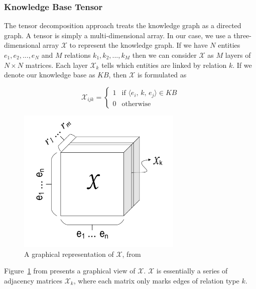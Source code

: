 \documentclass[pageno]{final_paper}
\begin{document}
\subsubsection{Knowledge Base Tensor}
\label{Knowledge Base Tensor}

The tensor decomposition approach treats the knowledge graph as a directed
graph. A tensor is simply a multi-dimensional array. In our case, we use a
three-dimensional array $\mathcal{X}$ to represent the knowledge graph. If we
have $N$ entities $e_1, e_2, ..., e_N$ and $M$ relations $k_1, k_2, ..., k_M$
then we can consider $\mathcal{X}$ as $M$ layers of $N\times N$ matrices. Each
layer $\mathcal{X}_k$ tells which entities are linked by relation $k$. If we
denote our knowledge base as $KB$, then $\mathcal{X}$ is formulated as

$$
\mathcal{X}_{ijk} =
\begin{cases}
    1 & \text{if } \langle e_i,\,k,\,e_j\rangle \in KB \\
    0 & \text{otherwise}
\end{cases}
$$

\begin{figure}[!tb]
    \centering
    \includegraphics[width=0.7\textwidth,keepaspectratio]{figures/tensor_figure.png}
    \caption{A graphical representation of $\mathcal{X}$, from \cite{Chang2014}}
    \label{fig: tensor figure}
\end{figure}

Figure~\ref{fig: tensor figure} from \cite{Chang2014} presents a graphical view
of $\mathcal{X}$. $\mathcal{X}$ is essentially a series of adjacency matrices
$\mathcal{X}_k$, where each matrix only marks edges of relation type $k$. \\
\end{document}
